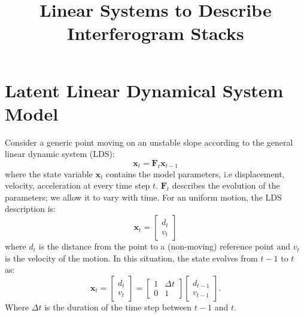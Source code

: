 \documentclass{article}
\title{Linear Systems to Describe Interferogram Stacks}
\begin{document}
\maketitle
\section{Latent Linear Dynamical System Model}\label{sec:displacement_model}
Consider a generic point moving on an unstable slope according to the general linear dynamic system (LDS):
\begin{equation}\label{eq:state_recursion}
	\mathbf{x}_t = \mathbf{F}_t \mathbf{x}_{t-1}
\end{equation}
where the state variable $\mathbf{x}_t$ contains the model parameters, i.e displacement, velocity, acceleration at every time step $t$. $\mathbf{F}_t$ describes the evolution of the parameters; we allow it to vary with time. For an uniform motion, the LDS description is:
\begin{equation}
\mathbf{x}_t = 
	\begin{bmatrix}
		d_{t}\\
		v_{t}
	\end{bmatrix}
\end{equation}
where $d_t$ is the distance from the point to a (non-moving) reference point and $v_t$ is the velocity of the motion.
In this situation, the state evolves from $t-1$ to $t$ as:
\begin{equation}
	\mathbf{x}_t = 
		\begin{bmatrix}
			d_{t}\\
			v_{t}
		\end{bmatrix} =
		\begin{bmatrix}
		1 & \Delta t\\
		0 & 1
		\end{bmatrix}
		\begin{bmatrix}
			d_{t-1}\\
			v_{t-1}
		\end{bmatrix}.
\end{equation}
Where $\Delta t$ is the duration of the time step between $t-1$ and $t$.\\
\end{document}
